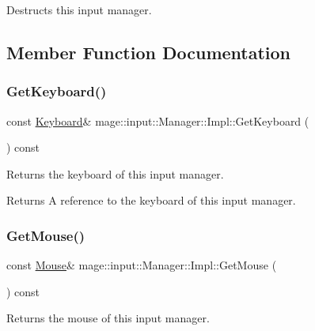 Destructs this input manager. 

\subsection{Member Function Documentation}
\hypertarget{classmage_1_1input_1_1_manager_1_1_impl_a7b43fbe5a7fd8697fea0e3c6b7d76186}{}\label{classmage_1_1input_1_1_manager_1_1_impl_a7b43fbe5a7fd8697fea0e3c6b7d76186} 
\subsubsection{\texorpdfstring{Get\+Keyboard()}{GetKeyboard()}}
{\footnotesize\ttfamily const \hyperlink{classmage_1_1input_1_1_keyboard}{Keyboard}\& mage\+::input\+::\+Manager\+::\+Impl\+::\+Get\+Keyboard (\begin{DoxyParamCaption}{ }\end{DoxyParamCaption}) const\hspace{0.3cm}{\ttfamily [noexcept]}}

Returns the keyboard of this input manager.

\begin{DoxyReturn}{Returns}
A reference to the keyboard of this input manager. 
\end{DoxyReturn}
\hypertarget{classmage_1_1input_1_1_manager_1_1_impl_a0ed01275d65a2fe3998c95fef0e12a8b}{}\label{classmage_1_1input_1_1_manager_1_1_impl_a0ed01275d65a2fe3998c95fef0e12a8b} 
\subsubsection{\texorpdfstring{Get\+Mouse()}{GetMouse()}}
{\footnotesize\ttfamily const \hyperlink{classmage_1_1input_1_1_mouse}{Mouse}\& mage\+::input\+::\+Manager\+::\+Impl\+::\+Get\+Mouse (\begin{DoxyParamCaption}{ }\end{DoxyParamCaption}) const\hspace{0.3cm}{\ttfamily [noexcept]}}

Returns the mouse of this input manager.

